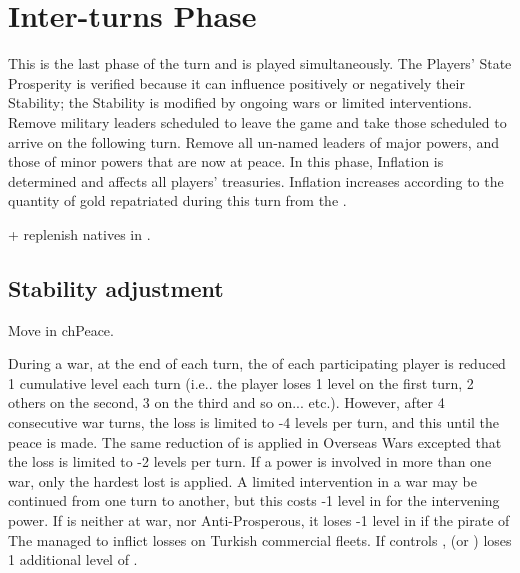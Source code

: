 \chapter{Inter-turns Phase}\label{chapter:Inter}

\InterPhase


This is the last phase of the turn and is played simultaneously.  The Players'
State Prosperity is verified because it can influence positively or negatively
their Stability; the Stability is modified by ongoing wars or limited
interventions.  Remove military leaders scheduled to leave the game and take
those scheduled to arrive on the following turn.  Remove all un-named leaders
of major powers, and those of minor powers that are now at peace.  In this
phase, Inflation is determined and affects all players' treasuries. Inflation
increases according to the quantity of gold repatriated during this turn from
the \ROTW.

\begin{todo}
  + replenish natives in \ROTW.
\end{todo}

\aparag[Sequence.]
\InterDetails



\section{Stability adjustment}
\begin{todo}
  Move in chPeace.
\end{todo}

During a war, at the end of each turn, the \STAB of each participating player
is reduced 1 cumulative level each turn (i.e.. the player loses 1 level on the
first turn, 2 others on the second, 3 on the third and so
on... etc.). However, after 4 consecutive war turns, the loss is limited to -4
levels per turn, and this until the peace is made.
The same reduction of \STAB is applied in Overseas Wars excepted that the loss
is limited to -2 levels per turn.
 If a power is involved in more than one war, only the
hardest lost is applied.
A limited intervention in a war may be continued from one turn to another, but
this costs -1 level in \STAB for the intervening power.
If \TUR is neither at war, nor Anti-Prosperous, it loses -1 level in \STAB if
the pirate of The  managed to inflict losses on Turkish
commercial fleets.
\aparag[Vienna]
If \TUR controls , \HAB (\SPA or \AUS) loses 1 additional level
of \STAB.

